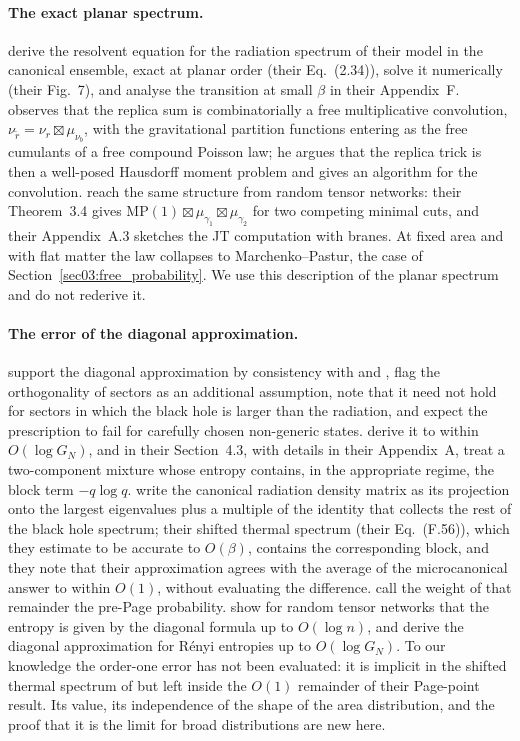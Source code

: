 \documentclass[11pt,letterpaper]{article}
\theoremstyle{plain}
\theoremstyle{definition}
\theoremstyle{remark}
\begin{document}
\paragraph{The exact planar spectrum.} \citet{pssyetal2022} derive the resolvent equation for the radiation spectrum of their model in the canonical ensemble, exact at planar order (their Eq.~(2.34)), solve it numerically (their Fig.~7), and analyse the transition at small $\beta$ in their Appendix~F. \citet{wang2023} observes that the replica sum is combinatorially a free multiplicative convolution, $\nu_{\tilde r} = \nu_r \boxtimes \mu_{\nu_b}$, with the gravitational partition functions entering as the free cumulants of a free compound Poisson law; he argues that the replica trick is then a well-posed Hausdorff moment problem and gives an algorithm for the convolution. \citet{chengetal2024} reach the same structure from random tensor networks: their Theorem~3.4 gives $\mathrm{MP}(1)\boxtimes\mu_{\gamma_1}\boxtimes\mu_{\gamma_2}$ for two competing minimal cuts, and their Appendix~A.3 sketches the JT computation with branes. At fixed area and with flat matter the law collapses to Marchenko--Pastur, the case of Section~\ref{sec03:free_probability}. We use this description of the planar spectrum and do not rederive it.

\paragraph{The error of the diagonal approximation.} \citet{marolfwangwang2020} support the diagonal approximation by consistency with \citet{murthysrednicki2019} and \citet{pssyetal2022}, flag the orthogonality of sectors as an additional assumption, note that it need not hold for sectors in which the black hole is larger than the radiation, and expect the prescription to fail for carefully chosen non-generic states. \citet{akerspenington2021} derive it to within $O(\log G_N)$, and in their Section~4.3, with details in their Appendix~A, treat a two-component mixture whose entropy contains, in the appropriate regime, the block term $-q\log q$. \citet{pssyetal2022} write the canonical radiation density matrix as its projection onto the largest eigenvalues plus a multiple of the identity that collects the rest of the black hole spectrum; their shifted thermal spectrum (their Eq.~(F.56)), which they estimate to be accurate to $O(\beta)$, contains the corresponding block, and they note that their approximation agrees with the average of the microcanonical answer to within $O(1)$, without evaluating the difference. \citet{akersetal2022} call the weight of that remainder the pre-Page probability. \citet{chengetal2024} show for random tensor networks that the entropy is given by the diagonal formula up to $O(\log n)$, and \citet{peningtonrath2025} derive the diagonal approximation for R\'enyi entropies up to $O(\log G_N)$. To our knowledge the order-one error has not been evaluated: it is implicit in the shifted thermal spectrum of \citet{pssyetal2022} but left inside the $O(1)$ remainder of their Page-point result. Its value, its independence of the shape of the area distribution, and the proof that it is the limit for broad distributions are new here.
\end{document}
